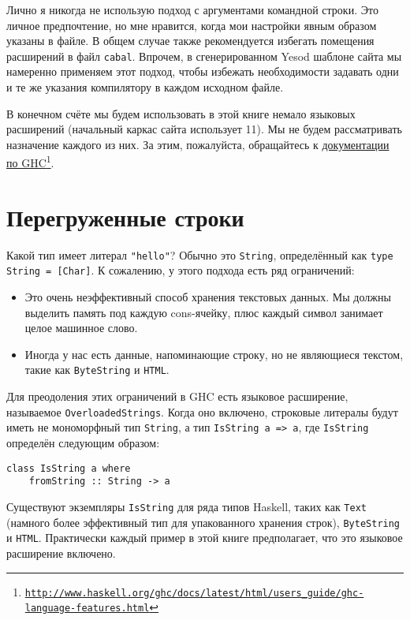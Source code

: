 Лично я никогда не использую подход с аргументами командной строки. Это личное предпочтение, но мне нравится, когда мои настройки явным образом указаны в файле. В общем случае также рекомендуется избегать помещения расширений в файл \texttt{cabal}. Впрочем, в сгенерированном Yesod шаблоне сайта  мы намеренно применяем этот подход, чтобы избежать необходимости задавать одни и те же указания компилятору в каждом исходном файле.

В конечном счёте мы будем использовать в этой книге немало языковых расширений (начальный каркас сайта использует 11). Мы не будем рассматривать назначение каждого из них. За этим, пожалуйста, обращайтесь к \href{http://www.haskell.org/ghc/docs/latest/html/users\_guide/ghc-language-features.html}{документации по GHC}\footnote{\href{http://www.haskell.org/ghc/docs/latest/html/users\_guide/ghc-language-features.html}{\texttt{http://www.haskell.org/ghc/docs/latest/html/users\_guide/ghc-language-features.html}}}.

\section{Перегруженные строки}

Какой тип имеет литерал \lstinline'"hello"'? Обычно это \lstinline'String', определённый как \lstinline'type String = [Char]'. К сожалению, у этого подхода есть ряд ограничений:
\begin{itemize}
\item Это очень неэффективный способ хранения текстовых данных. Мы должны выделить память под каждую cons-ячейку, плюс каждый символ занимает целое машинное слово.
\item Иногда у нас есть данные, напоминающие строку, но не являющиеся текстом, такие как \lstinline'ByteString' и \lstinline'HTML'.
\end{itemize}

Для преодоления этих ограничений в GHC есть языковое расширение, называемое \lstinline'OverloadedStrings'. Когда оно включено, строковые литералы будут иметь не мономорфный тип \lstinline'String', а тип \lstinline'IsString a => a', где \lstinline'IsString' определён следующим образом:

\begin{lstlisting}
class IsString a where
    fromString :: String -> a
\end{lstlisting}

Существуют экземпляры \lstinline'IsString' для ряда типов Haskell, таких как \lstinline'Text' (намного более эффективный тип для упакованного хранения строк), \lstinline'ByteString' и \lstinline'HTML'. Практически каждый пример в этой книге предполагает, что это языковое расширение включено.

